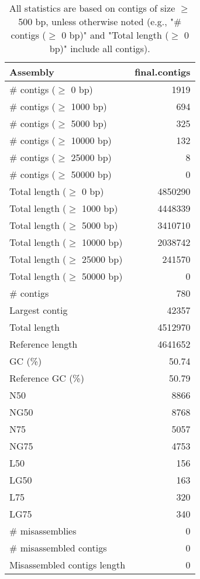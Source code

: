 \documentclass[12pt,a4paper]{article}
\begin{document}
\begin{table}[ht]
\begin{center}
\caption{All statistics are based on contigs of size $\geq$ 500 bp, unless otherwise noted (e.g., "\# contigs ($\geq$ 0 bp)" and "Total length ($\geq$ 0 bp)" include all contigs).}
\begin{tabular}{|l*{1}{|r}|}
\hline
Assembly & final.contigs \\ \hline
\# contigs ($\geq$ 0 bp) & 1919 \\ \hline
\# contigs ($\geq$ 1000 bp) & 694 \\ \hline
\# contigs ($\geq$ 5000 bp) & 325 \\ \hline
\# contigs ($\geq$ 10000 bp) & 132 \\ \hline
\# contigs ($\geq$ 25000 bp) & 8 \\ \hline
\# contigs ($\geq$ 50000 bp) & 0 \\ \hline
Total length ($\geq$ 0 bp) & 4850290 \\ \hline
Total length ($\geq$ 1000 bp) & 4448339 \\ \hline
Total length ($\geq$ 5000 bp) & 3410710 \\ \hline
Total length ($\geq$ 10000 bp) & 2038742 \\ \hline
Total length ($\geq$ 25000 bp) & 241570 \\ \hline
Total length ($\geq$ 50000 bp) & 0 \\ \hline
\# contigs & 780 \\ \hline
Largest contig & 42357 \\ \hline
Total length & 4512970 \\ \hline
Reference length & 4641652 \\ \hline
GC (\%) & 50.74 \\ \hline
Reference GC (\%) & 50.79 \\ \hline
N50 & 8866 \\ \hline
NG50 & 8768 \\ \hline
N75 & 5057 \\ \hline
NG75 & 4753 \\ \hline
L50 & 156 \\ \hline
LG50 & 163 \\ \hline
L75 & 320 \\ \hline
LG75 & 340 \\ \hline
\# misassemblies & 0 \\ \hline
\# misassembled contigs & 0 \\ \hline
Misassembled contigs length & 0 \\ \hline

\end{tabular}
\end{center}
\end{table}
\end{document}
